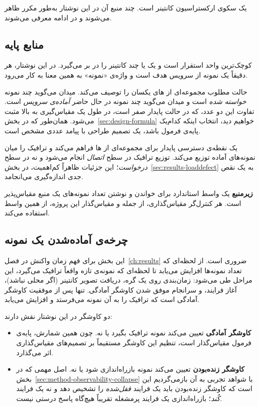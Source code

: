  یک سکوی ارکستراسیون کانتینر است. چند منبع آن در این نوشتار به‌طور مکرر ظاهر
می‌شوند و در ادامه معرفی می‌شوند.

\subsection{منابع پایه}
\label{sec:bg-k8s-resources}

\textbf{} کوچک‌ترین واحد استقرار است و یک یا چند کانتینر را در بر می‌گیرد. در این
نوشتار، هر  دقیقاً یک نمونه از سرویس هدف است و واژه‌ی «نمونه» به همین معنا به کار
می‌رود.

\textbf{} حالت مطلوب مجموعه‌ای از ‌های یکسان را توصیف می‌کند. میدان
 می‌گوید چند نمونه \emph{خواسته شده} است و میدان
 می‌گوید چند نمونه در حال حاضر \emph{آماده‌ی سرویس} است. تفاوت این
دو عدد، که در حالت پایدار صفر است، در طول یک مقیاس‌گیری به بالا مثبت می‌شود. همان‌طور که در
بخش~\ref{sec:design-formula} خواهیم دید، انتخاب اینکه کدام‌یک پایه‌ی فرمول باشد، یک تصمیم
طراحی با پیامد عددی مشخص است.

\textbf{} یک نقطه‌ی دسترسی پایدار برای مجموعه‌ای از ‌ها فراهم می‌کند و
ترافیک را میان نمونه‌های آماده توزیع می‌کند. توزیع ترافیک در سطح \emph{اتصال} انجام می‌شود و
نه در سطح \emph{درخواست}؛ این جزئیات ظاهراً کم‌اهمیت، در بخش~\ref{sec:results-loaddefect} به
یک نقص جدی اندازه‌گیری می‌انجامد.

\textbf{زیرمنبع } یک واسط استاندارد برای خواندن و نوشتن تعداد نمونه‌های یک منبع
مقیاس‌پذیر است. هر کنترل‌گر مقیاس‌گذاری، از جمله  و مقیاس‌گذار این پروژه، از همین
واسط استفاده می‌کند.

\subsection{چرخه‌ی آماده‌شدن یک نمونه}
\label{sec:bg-k8s-readiness}

این بخش برای فهم زمان واکنش در فصل~\ref{ch:results} ضروری است. از لحظه‌ای که تعداد نمونه‌ها
افزایش می‌یابد تا لحظه‌ای که نمونه‌ی تازه واقعاً ترافیک می‌گیرد، این مراحل طی می‌شود:
زمان‌بندی روی یک گره، دریافت تصویر کانتینر (اگر محلی نباشد)، آغاز فرایند، و سرانجام موفق شدن
کاوشگر آمادگی. تنها پس از موفقیت کاوشگر آمادگی است که
 ترافیک را به آن نمونه می‌فرستد و  افزایش می‌یابد.

دو کاوشگر در این نوشتار نقش دارند:

\begin{itemize}
  \item \textbf{کاوشگر آمادگی} تعیین می‌کند نمونه ترافیک بگیرد یا نه. چون همین شمارش، پایه‌ی
  فرمول مقیاس‌گذار است، تنظیم این کاوشگر مستقیماً بر تصمیم‌های مقیاس‌گذاری اثر می‌گذارد.
  \item \textbf{کاوشگر زنده‌بودن} تعیین می‌کند نمونه بازراه‌اندازی
  شود یا نه. اصل مهمی که در بخش~\ref{sec:method-observability-collapse} با شواهد تجربی به آن
  بازمی‌گردیم این است که کاوشگر زنده‌بودن باید یک فرایند \emph{قفل‌شده} را تشخیص دهد و نه یک
  فرایند \emph{کُند}؛ بازراه‌اندازی یک فرایند پرمشغله تقریباً هیچ‌گاه پاسخ درستی نیست.
\end{itemize}

